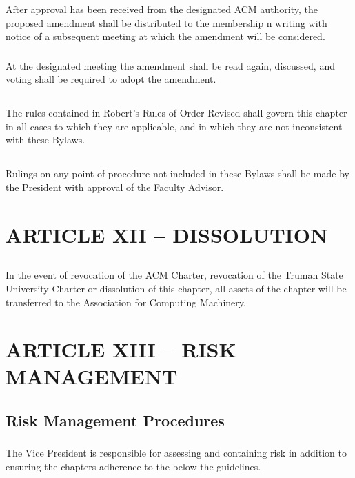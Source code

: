 \documentclass[12pt]{article}
\begin{document}
\subsubsection{}	After approval has been received from the designated ACM authority, the proposed amendment shall be distributed to the membership n writing with notice of a subsequent meeting at which the amendment will be considered.
\subsubsection{}	At the designated meeting the amendment shall be read again, discussed, and voting shall be required to adopt the amendment.
\subsection{}	The rules contained in Robert's Rules of Order Revised shall govern this chapter in all cases to which they are applicable, and in which they are not inconsistent with these Bylaws.
\subsection{}	Rulings on any point of procedure  not included in these Bylaws shall be made by the President with approval of the Faculty Advisor.

\section{ARTICLE XII – DISSOLUTION}
\subsection{}	In the event of revocation of the ACM Charter, revocation of the Truman State University Charter or dissolution of this chapter, all assets of the chapter will be transferred to the Association for Computing Machinery.

\section{ARTICLE XIII – RISK MANAGEMENT}
\subsection{Risk Management Procedures}
\subsubsection{}	The Vice President is responsible for assessing and containing risk in addition to ensuring the chapters adherence to the below the guidelines.
\end{document}
